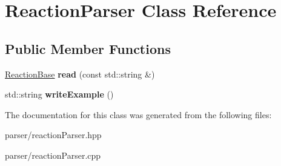 \hypertarget{classReactionParser}{}\section{Reaction\+Parser Class Reference}
\label{classReactionParser}
\subsection*{Public Member Functions}
\begin{DoxyCompactItemize}
\item 
\mbox{\label{classReactionParser_aed8877fa71830d708ac5094e2e48a0f2}} 
\mbox{\hyperlink{classReactionBase}{Reaction\+Base}} {\bfseries read} (const std\+::string \&)
\item 
\mbox{\label{classReactionParser_af9e8eb32819c7a054be382f8df4e1cc1}} 
std\+::string {\bfseries write\+Example} ()
\end{DoxyCompactItemize}


The documentation for this class was generated from the following files\+:\begin{DoxyCompactItemize}
\item 
parser/reaction\+Parser.\+hpp\item 
parser/reaction\+Parser.\+cpp\end{DoxyCompactItemize}

